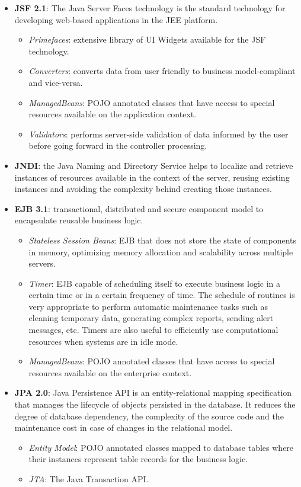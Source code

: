 \documentclass[envcountsame,envcountchap]{svmono}
\begin{document}
\begin{itemize}
\item \textbf{JSF 2.1}: The Java Server Faces technology is the standard technology for developing web-based applications in the JEE platform.
   \begin{itemize}
   \item \textit{Primefaces}: extensive library of UI Widgets 
   available for the JSF technology.
   \item \textit{Converters}: converts data from user friendly to
   business model-compliant and vice-versa.
   \item \textit{ManagedBeans}: POJO annotated classes that have
   access to special resources available on the
   application context.
   \item \textit{Validators}: performs server-side validation of
   data informed by the user before going forward in the
   controller processing.
   \end{itemize}
\item \textbf{JNDI}: the Java Naming and Directory Service helps to localize and retrieve instances of resources available in the context of the server, reusing existing instances and avoiding the complexity behind creating those instances.
\item \textbf{EJB 3.1}: transactional, distributed and secure component model to encapsulate reusable business logic.
   \begin{itemize}
   \item \textit{Stateless Session Beans}: EJB that does not store
   the state of components in memory, optimizing memory
   allocation and scalability across multiple servers.
   \item \textit{Timer}: EJB capable of scheduling itself to
   execute business logic in a certain time or in a
   certain frequency of time. The schedule of routines is
   very appropriate to perform automatic maintenance
   tasks such as cleaning temporary data, generating
   complex reports, sending alert messages, etc. Timers
   are also useful to efficiently use computational
   resources when systems are in idle mode.
   \item \textit{ManagedBeans}: POJO annotated classes that have
   access to  special resources available on the enterprise
   context.
   \end{itemize}
\item \textbf{JPA 2.0}: Java Persistence API is an entity-relational mapping specification that manages the lifecycle of objects persisted in the database. It reduces the degree of database dependency, the complexity of the source code and the maintenance cost in case of changes in the relational model.
   \begin{itemize}
   \item \textit{Entity Model}: POJO annotated classes mapped to
   database tables where their instances represent table records
   for the business logic.
   \item \textit{JTA}: The Java Transaction API.
   \end{itemize}
\end{itemize}
\end{document}
